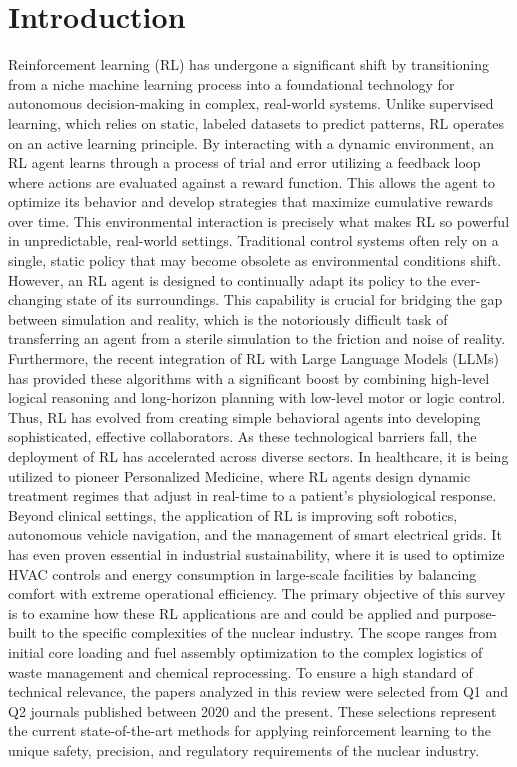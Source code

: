 \documentclass{article}
\begin{document}
\section{Introduction}
Reinforcement learning (RL) has undergone a significant shift by transitioning from a niche machine learning process into a foundational technology for autonomous decision-making in complex, real-world systems. Unlike supervised learning, which relies on static, labeled datasets to predict patterns, RL operates on an active learning principle. By interacting with a dynamic environment, an RL agent learns through a process of trial and error utilizing a feedback loop where actions are evaluated against a reward function. This allows the agent to optimize its behavior and develop strategies that maximize cumulative rewards over time. 
\newline
This environmental interaction is precisely what makes RL so powerful in unpredictable, real-world settings. Traditional control systems often rely on a single, static policy that may become obsolete as environmental conditions shift. However, an RL agent is designed to continually adapt its policy to the ever-changing state of its surroundings. This capability is crucial for bridging the gap between simulation and reality, which is the notoriously difficult task of transferring an agent from a sterile simulation to the friction and noise of reality. Furthermore, the recent integration of RL with Large Language Models (LLMs) has provided these algorithms with a significant boost by combining high-level logical reasoning and long-horizon planning with low-level motor or logic control. Thus, RL has evolved from creating simple behavioral agents into developing sophisticated, effective collaborators.
\newline
As these technological barriers fall, the deployment of RL has accelerated across diverse sectors. In healthcare, it is being utilized to pioneer Personalized Medicine, where RL agents design dynamic treatment regimes that adjust in real-time to a patient’s physiological response. Beyond clinical settings, the application of RL is improving soft robotics, autonomous vehicle navigation, and the management of smart electrical grids. It has even proven essential in industrial sustainability, where it is used to optimize HVAC controls and energy consumption in large-scale facilities by balancing comfort with extreme operational efficiency.
\newline
The primary objective of this survey is to examine how these RL applications are and could be applied and purpose-built to the specific complexities of the nuclear industry. The scope ranges from initial core loading and fuel assembly optimization to the complex logistics of waste management and chemical reprocessing. To ensure a high standard of technical relevance, the papers analyzed in this review were selected from Q1 and Q2 journals published between 2020 and the present. These selections represent the current state-of-the-art methods for applying reinforcement learning to the unique safety, precision, and regulatory requirements of the nuclear industry.
\end{document}
